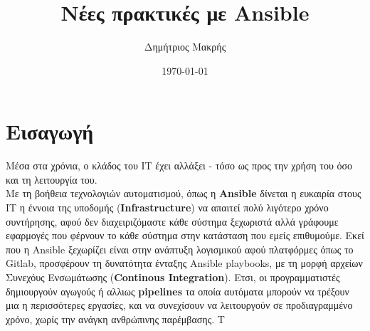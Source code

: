 \documentclass[a4paper,12pt]{article}
\begin{document}
\title{
        \large Νέες πρακτικές με Ansible}

\author{Δημήτριος Μακρής}
\date{\today}
\maketitle

\renewcommand*\contentsname{Περιεχόμενα}
\tableofcontents

\section{Εισαγωγή}
Μέσα στα χρόνια, ο κλάδος του ΙΤ έχει αλλάξει - τόσο ως προς την χρήση του όσο και τη λειτουργία του.\\
Με τη βοήθεια τεχνολογιών αυτοματισμού, όπως η \textbf{Ansible} δίνεται η ευκαιρία στους ΙΤ η έννοια της υποδομής (\textbf{Infrastructure}) να απαιτεί πολύ λιγότερο χρόνο συντήρησης, αφού δεν διαχειριζόμαστε κάθε σύστημα ξεχωριστά αλλά γράφουμε εφαρμογές που φέρνουν το κάθε σύστημα στην κατάσταση που εμείς επιθυμούμε.\hfill \break
Εκεί που η Ansible ξεχωρίζει είναι στην ανάπτυξη λογισμικού αφού πλατφόρμες όπως το Gitlab, προσφέρουν τη δυνατότητα ένταξης Ansible playbooks, με τη μορφή αρχείων Συνεχόυς Ενσωμάτωσης (\textbf{Continous Integration}).\hfill \break
Ετσι, οι προγραμματιστές δημιουργούν αγωγούς ή αλλιως \textbf{pipelines} τα οποία αυτόματα μπορούν να τρέξουν μια η περισσότερες εργασίες, και να συνεχίσουν να λειτουργούν σε προδιαγραμμένο χρόνο, χωρίς την ανάγκη ανθρώπινης παρέμβασης.\hfill \break
Τ

\newpage
\end{document}
